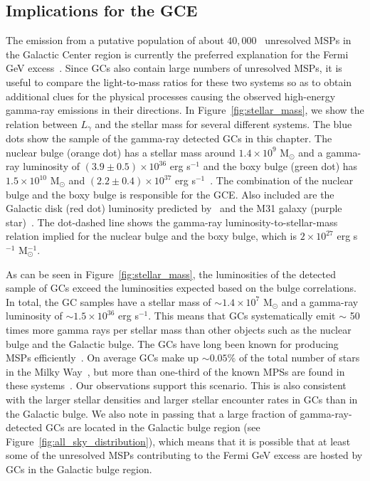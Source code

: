\documentclass[doublespace,nopageskip]{VTthesis} %
\begin{document}
\subsection{Implications for the GCE}

The emission from a putative population of about $40,000$~\citep{2020JCAP...12..035P} unresolved MSPs in the Galactic Center region is currently the preferred explanation for the Fermi GeV excess~\citep{2018NatAs...2..387M,2018NatAs...2..819B,2019JCAP...09..042M,2020PhRvD.102d3012A}. Since GCs also contain large numbers of unresolved MSPs, it is useful to compare the light-to-mass ratios for these two systems so as to obtain additional clues for the physical processes causing the observed high-energy gamma-ray emissions in their directions. In Figure~\ref{fig:stellar_mass}, we show the relation between $L_\gamma$ and the stellar mass for several different systems. The blue dots show the sample of the gamma-ray detected GCs in this chapter. The nuclear bulge (orange dot) has a stellar mass around $1.4\times 10^9$ M$_\odot$ and a gamma-ray luminosity of $(3.9\pm 0.5)\times 10^{36}$ erg s$^{-1}$ and the boxy bulge (green dot) has $1.5\times 10^{10}$ M$_\odot$ and $(2.2 \pm 0.4)\times 10^{37}$ erg s$^{-1}$~\citep{2019JCAP...09..042M}. The combination of the nuclear bulge and the boxy bulge is responsible for the GCE. Also included are the Galactic disk (red dot) luminosity predicted by~\citet{2018NatAs...2..819B} and the M31 galaxy (purple star)~\citep{2017ApJ...836..208A}. The dot-dashed line shows the gamma-ray luminosity-to-stellar-mass relation implied for the nuclear bulge and the boxy bulge, which is $2 \times 10^{27}$ erg s$^{-1}$ M$_\odot^{-1}$. 

As can be seen in Figure~\ref{fig:stellar_mass}, the luminosities of the detected sample of GCs exceed the luminosities expected based on the bulge correlations. In total, the GC samples have a stellar mass of $\sim 1.4\times 10^7$ M$_\odot$ and a gamma-ray luminosity of $\sim 1.5\times 10^{36}$ erg s$^{-1}$. This means that GCs systematically emit $\sim$ 50 times more gamma rays per stellar mass than other objects such as the nuclear bulge and the Galactic bulge. The GCs have long been known for producing MSPs efficiently~\citep{2005ASPC..328..147C}. On average GCs make up $\sim 0.05\%$ of the total number of stars in the Milky Way~\citep{2019ApJ...877..122Y}, but more than one-third of the known MPSs are found in these systems~\citep{2005AJ....129.1993M}. Our observations support this scenario. This is also consistent with the larger stellar densities and larger stellar encounter rates in GCs than in the Galactic bulge. We also note in passing that a large fraction of gamma-ray-detected GCs are located in the Galactic bulge region (see Figure~\ref{fig:all_sky_distribution}), which means that it is possible that at least some of the unresolved MSPs contributing to the Fermi GeV excess are hosted by GCs in the Galactic bulge region.
\end{document}
